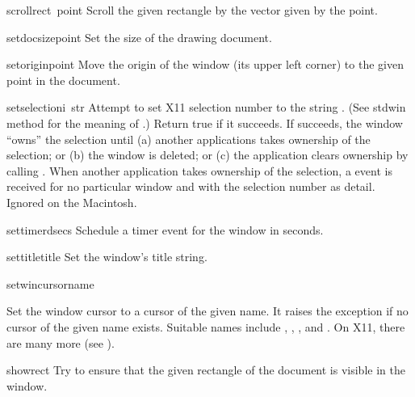 \begin{funcdesc}{scroll}{rect\, point}
Scroll the given rectangle by the vector given by the point.
\end{funcdesc}

\begin{funcdesc}{setdocsize}{point}
Set the size of the drawing document.
\end{funcdesc}

\begin{funcdesc}{setorigin}{point}
Move the origin of the window (its upper left corner)
to the given point in the document.
\end{funcdesc}

\begin{funcdesc}{setselection}{i\, str}
Attempt to set X11 selection number
to the string
.
(See stdwin method
for the meaning of
.)
Return true if it succeeds.
If  succeeds, the window ``owns'' the selection until
(a) another applications takes ownership of the selection; or
(b) the window is deleted; or
(c) the application clears ownership by calling
.
When another application takes ownership of the selection, a
event is received for no particular window and with the selection number
as detail.
Ignored on the Macintosh.
\end{funcdesc}

\begin{funcdesc}{settimer}{dsecs}
Schedule a timer event for the window in
seconds.
\end{funcdesc}

\begin{funcdesc}{settitle}{title}
Set the window's title string.
\end{funcdesc}

\begin{funcdesc}{setwincursor}{name}
\begin{sloppypar}
Set the window cursor to a cursor of the given name.
It raises the
exception if no cursor of the given name exists.
Suitable names include
,
,
,
and
.
On X11, there are many more (see
).
\end{sloppypar}
\end{funcdesc}

\begin{funcdesc}{show}{rect}
Try to ensure that the given rectangle of the document is visible in
the window.
\end{funcdesc}

